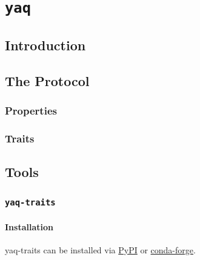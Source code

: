\chapter{\texttt{yaq}} \label{cha:yaq}

\newcommand\yaqcqtpy{\texttt{yaqc-qtpy}}
\clearpage

\section{Introduction}  %

\clearpage

\section{The \yaq Protocol}  %


\subsection{Properties}

\subsection{Traits}

\clearpage

\section{Tools}

\subsection{\texttt{yaq-traits}}

\hypertarget{installation}{%
\subsubsection{Installation}\label{installation}}

yaq-traits can be installed via
\href{https://pypi.org/project/yaq-traits/}{PyPI} or
\href{https://anaconda.org/conda-forge/yaq-traits}{conda-forge}.


